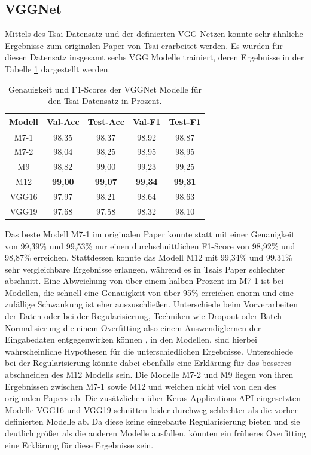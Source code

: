 \documentclass[twoside,a4paper]{IEEEtran}
\begin{document}
\subsection{VGGNet}

Mittels des Tsai Datensatz und der definierten VGG Netzen konnte sehr ähnliche Ergebnisse zum originalen Paper von Tsai erarbeitet werden. Es wurden für diesen Datensatz insgesamt sechs VGG Modelle trainiert, deren Ergebnisse in der Tabelle \ref{vgg_ergebnis_tsai} dargestellt werden.
\begin{table}[!htb]
	\caption{Genauigkeit und F1-Scores der VGGNet Modelle für den Tsai-Datensatz in Prozent.}
	\label{vgg_ergebnis_tsai}
	\centering
	\begin{tabular}{|c|c|c|c|c|}
		\hline
		Modell & Val-Acc & Test-Acc & Val-F1 & Test-F1\\
		\hline
		\hline
		M7-1 & 98,35 & 98,37 & 98,92 & 98,87\\
		\hline
		M7-2 & 98,04 & 98,25 & 98,95 & 98,95\\
		\hline
		M9 & 98,82 & 99,00 & 99,23 & 99,25\\
		\hline 
		M12 & \textbf{99,00} & \textbf{99,07} & \textbf{99,34} & \textbf{99,31}\\
		\hline 
		VGG16 & 97,97 & 98,21 & 98,64 & 98,63\\
		\hline 
		VGG19 & 97,68 & 97,58 & 98,32 & 98,10\\
		\hline 
	\end{tabular}
\end{table}

Das beste Modell M7-1 im originalen Paper konnte statt mit einer Genauigkeit von 99,39\% und 99,53\% nur einen durchschnittlichen F1-Score von 98,92\% und 98,87\% erreichen. Stattdessen konnte das Modell M12 mit 99,34\% und 99,31\% sehr vergleichbare Ergebnisse erlangen, während es in Tsais Paper schlechter abschnitt. Eine Abweichung von über einem halben Prozent im M7-1 ist bei Modellen, die schnell eine Genauigkeit von über 95\% erreichen enorm und eine zufällige Schwankung ist eher auszuschließen. Unterschiede beim Vorverarbeiten der Daten oder bei der Regularisierung, Techniken wie Dropout oder Batch-Normalisierung die einem Overfitting also einem Auswendiglernen der Eingabedaten entgegenwirken können \cite[S.27]{MACHINE_LEARNING}, in den Modellen, sind hierbei wahrscheinliche Hypothesen für die unterschiedlichen Ergebnisse. Unterschiede bei der Regularisierung könnte dabei ebenfalls eine Erklärung für das besseres abschneiden des M12 Modells sein. Die Modelle M7-2 und M9 liegen von ihren Ergebnissen zwischen M7-1 sowie M12 und weichen nicht viel von den des originalen Papers ab. Die zusätzlichen über Keras Applications API eingesetzten Modelle VGG16 und VGG19 schnitten leider durchweg schlechter als die vorher definierten Modelle ab. Da diese keine eingebaute Regularisierung bieten \cite{keras_vgg} und sie deutlich größer als die anderen Modelle ausfallen, könnten ein früheres Overfitting eine Erklärung für diese Ergebnisse sein.
\end{document}
